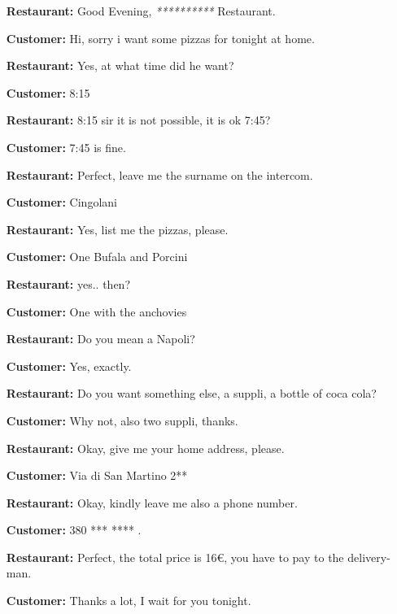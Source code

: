 \begin{itemize}

\item[\textbf{Restaurant:}] Good Evening, \textit{**********} Restaurant.

\item[\textbf{Customer:}] Hi, sorry i want some pizzas for tonight at home.

\item[\textbf{Restaurant:}] Yes, at what time did he want? 

\item[\textbf{Customer:}]  8:15

\item[\textbf{Restaurant:}] 8:15 sir it is not possible, it is ok 7:45? 

\item[\textbf{Customer:}] 7:45 is fine. 

\item[\textbf{Restaurant:}] Perfect, leave me the surname on the intercom. 

\item[\textbf{Customer:}] Cingolani

\item[\textbf{Restaurant:}] Yes, list me the pizzas, please. 

\item[\textbf{Customer:}]  One Bufala and Porcini

\item[\textbf{Restaurant:}] yes.. then?

\item[\textbf{Customer:}]   One with the anchovies 

\item[\textbf{Restaurant:}] Do you mean a Napoli?

\item[\textbf{Customer:}]   Yes, exactly.

\item[\textbf{Restaurant:}] Do you want something else, a suppli, a bottle of coca cola?

\item[\textbf{Customer:}]   Why not, also two suppli, thanks.

\item[\textbf{Restaurant:}] Okay, give me your home address, please. 

\item[\textbf{Customer:}]   Via di San Martino 2**

\item[\textbf{Restaurant:}] Okay, kindly leave me also a phone number.

\item[\textbf{Customer:}]   380 *** **** .

\item[\textbf{Restaurant:}] Perfect, the total price is 16€, you have to pay to the delivery-man.

\item[\textbf{Customer:}]   Thanks a lot, I wait for you tonight.

\end{itemize}
